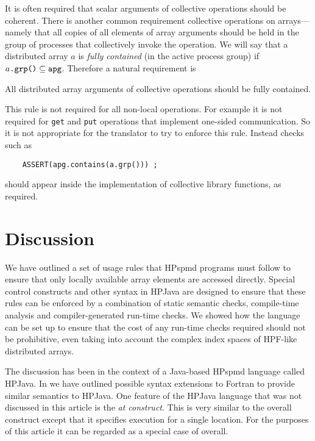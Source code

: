 \documentclass{article}
\begin{document}
It is often required that scalar arguments of collective operations
should be coherent.  There is another common requirement collective
operations on arrays---namely that all copies of all
elements of array arguments should be held in the group of processes
that collectively invoke the operation.  We will say that a distributed
array $a$ is {\em fully contained} (in the active process group) if
$a\mbox{\tt .grp()} \subseteq \mbox{\tt apg}$.  Therefore a natural
requirement is
\begin{usageRule}
All distributed array arguments of collective operations should
be fully contained.
\end{usageRule}
This rule is not required for all non-local operations.  For example
it is not required for {\tt get} and {\tt put} operations that
implement one-sided communication.  So it is not appropriate for
the translator to try to enforce this rule.  Instead checks such
as
\small
\begin{verbatim}
    ASSERT(apg.contains(a.grp())) ;
\end{verbatim}
\normalsize
should appear inside the implementation of collective library functions,
as required.

\section{Discussion\label{sec:discussion}}

We have outlined a set of usage rules that HPspmd programs must
follow to ensure that only locally available array elements are
accessed directly.  Special control constructs and other syntax in
HPJava are designed to ensure that these rules can be
enforced by a combination of static semantic checks, compile-time
analysis and compiler-generated run-time checks.  We showed how the
language can be set up to ensure that the cost of any run-time checks
required should not be prohibitive, even taking into account the
complex index spaces of HPF-like distributed arrays.

The discussion has been in the context of a Java-based HPspmd language
called HPJava.  In \cite{Bindings} we have outlined possible syntax
extensions to Fortran to provide similar semantics to HPJava.
One feature of the HPJava language that was not discussed in this
article is the {\em at construct}.  This is very similar to the
overall construct except that it specifies execution for a single
location.  For the purposes of this article it can be regarded as
a special case of overall.
\end{document}
